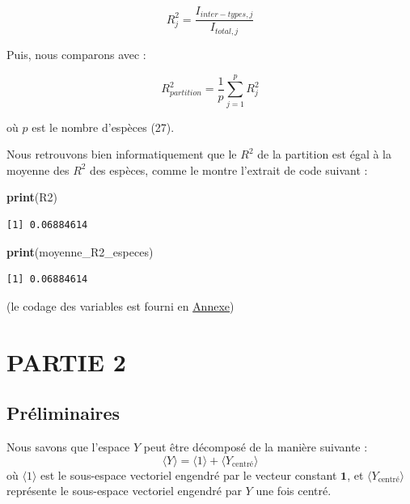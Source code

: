 \documentclass[
]{article}
\newenvironment{Shaded}{\begin{snugshade}}{\end{snugshade}}
\newcommand{\FunctionTok}[1]{\textcolor[rgb]{0.13,0.29,0.53}{\textbf{#1}}}
\newcommand{\NormalTok}[1]{#1}
\begin{document}
\[
R^2_{j} = \frac{I_{inter-types,j}}{I_{total,j}}
\]

Puis, nous comparons avec :

\[
R^2_{partition} = \frac{1}{p} \sum_{j=1}^{p} R^2_{j}
\]

où \(p\) est le nombre d'espèces (27).

Nous retrouvons bien informatiquement que le \(R^2\) de la partition est
égal à la moyenne des \(R^2\) des espèces, comme le montre l'extrait de
code suivant :

\begin{Shaded}
\begin{Highlighting}[]
\FunctionTok{print}\NormalTok{(R2)}
\end{Highlighting}
\end{Shaded}

\begin{verbatim}
[1] 0.06884614
\end{verbatim}

\begin{Shaded}
\begin{Highlighting}[]
\FunctionTok{print}\NormalTok{(moyenne\_R2\_especes)}
\end{Highlighting}
\end{Shaded}

\begin{verbatim}
[1] 0.06884614
\end{verbatim}

(le codage des variables est fourni en
\protect\hyperlink{annexe}{Annexe})

\newpage

\hypertarget{partie-2}{%
\section{PARTIE 2}\label{partie-2}}

\hypertarget{pruxe9liminaires}{%
\subsection{Préliminaires}\label{pruxe9liminaires}}

Nous savons que l'espace \(Y\) peut être décomposé de la manière
suivante : \[
\langle Y \rangle = \langle 1 \rangle + \langle Y_{\text{centré}} \rangle
\] où \(\langle 1 \rangle\) est le sous-espace vectoriel engendré par le
vecteur constant \(\mathbf{1}\), et
\(\langle Y_{\text{centré}} \rangle\) représente le sous-espace
vectoriel engendré par \(Y\) une fois centré.
\end{document}

